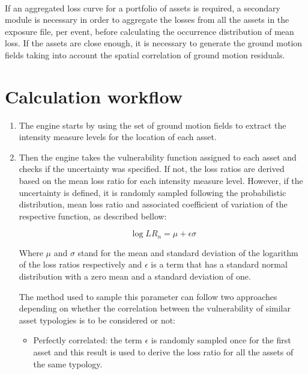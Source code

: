 \hfill \\

If an aggregated loss curve for a portfolio of assets is required, a secondary module is necessary in order to aggregate the losses from all the assets in the exposure file, per event, before calculating the occurrence distribution of mean loss. If the assets are close enough, it is necessary to generate the ground motion fields taking into account the spatial correlation of ground motion residuals. 

\section{Calculation workflow}

\begin{enumerate}
\item The  engine starts by using the set of ground motion fields to extract the intensity measure levels for the location of each asset. 
 
\item Then the engine takes the vulnerability function assigned to each asset and checks if the uncertainty was specified. If not, the loss ratios are derived based on the mean loss ratio for each intensity measure level. However, if the uncertainty is defined, it is randomly sampled following the probabilistic distribution, mean loss ratio and associated coefficient of variation of the respective function, as described bellow:

\begin{equation}
\log{LR_n} = \mu + \epsilon\sigma
\end{equation}

Where $\mu$ and $\sigma$ stand for the mean and standard deviation of the logarithm of the loss ratios respectively and $\epsilon$ is a term that has a standard normal distribution with a zero mean and a standard deviation of one.  

The method used to sample this parameter can follow two approaches depending on whether the correlation between the vulnerability of similar asset typologies is to be considered or not:

\begin{itemize}

\item Perfectly correlated: the term $\epsilon$ is randomly sampled once for the first asset and this result is used to derive the loss ratio for all the assets of the same typology. 


\end{itemize}
\end{enumerate}
